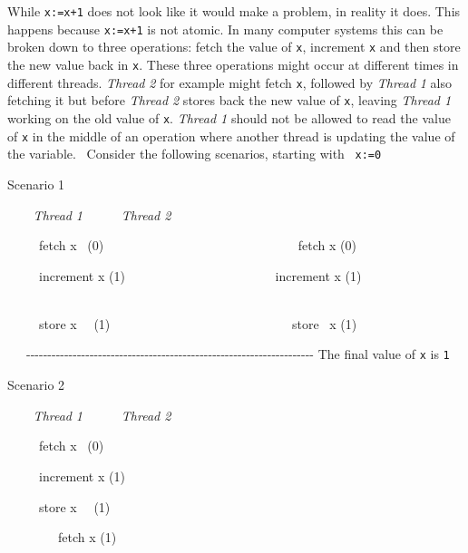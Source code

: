 While \texttt{x:=x+1} does not look like it would make a
problem, in reality it does. This happens because
\texttt{x:=x+1} is not atomic. In many computer systems this
can be broken down to three operations: fetch the value of
\texttt{x}, increment \texttt{x} and then store
the new value back in \texttt{x}. These three
operations might occur at different times in different threads.
\textit{Thread}\textit{ }\textit{2} for example might fetch
\texttt{x}, followed by \textit{Thread}\textit{
}\textit{1} also fetching it but before \textit{Thread 2} stores back
the new value of \texttt{x}, leaving \textit{Thread 1
}working on the old value of \texttt{x}. \textit{Thread
1 }should not be allowed to read the value of
\texttt{x} in the middle of an operation where another
thread is updating the value of the variable. \ Consider the following
scenarios, starting with \ \texttt{x:=0}\texttt{
}


\bigskip

Scenario 1

\textit{\ \ \ \ }\textit{Thread}\textit{
}\textit{1}\textit{\ \ \ \ \ \ }\textit{Thread 2}\textit{
}\textit{\ \ }\ \ 

\ \ \ \ \ fetch x \ (0)
\ \ \ \ \ \ \ \ \ \ \ \ \ \ \ \ \ \ \ \ \ \ \ \ \ \ \ \ \ \ fetch x (0)

\ \ \ \ \ increment x (1)
\ \ \ \ \ \ \ \ \ \ \ \ \ \ \ \ \ \ \ \ \ \ \ increment x (1)
\ \ \ \ \ \ \ \ \ \ \ \ \ \ \ \ \ \ \ 

\ \ \ \ \ store x \ \ (1)
\ \ \ \ \ \ \ \ \ \ \ \ \ \ \ \ \ \ \ \ \ \ \ \ \ \ \ \ store \ x (1)
\ 

\ \ \ {}-{}-{}-{}-{}-{}-{}-{}-{}-{}-{}-{}-{}-{}-{}-{}-{}-{}-{}-{}-{}-{}-{}-{}-{}-{}-{}-{}-{}-{}-{}-{}-{}-{}-{}-{}-{}-{}-{}-{}-{}-{}-{}-{}-{}-{}-{}-{}-{}-{}-{}-{}-{}-{}-{}-{}-{}-{}-{}-{}-{}-{}-{}-{}-{}-{}-{}-{}-
The final value of \texttt{x} is \texttt{1}


\bigskip

Scenario 2

\textit{\ \ \ \ }\textit{Thread}\textit{
}\textit{1}\textit{\ \ \ \ \ \ }\textit{Thread 2}\textit{
}\textit{\ \ \ \ }

\ \ \ \ \ fetch x \ (0) \ \ \ \ \ \ \ \ \ \ \ \ \ \ \ \ \ \ \ \ \ \ \ \ 

\ \ \ \ \ increment x (1) \ \ \ \ \ \ \ \ \ \ \ \ \ \ \ \ \ 

\ \ \ \ \ store x \ \ (1) \ \ \ \ \ \ \ \ \ \ \ \ \ \ \ \ \ \ \ \ \ \ \ 

\ \ \ \ \ \ \ \ fetch x (1)

